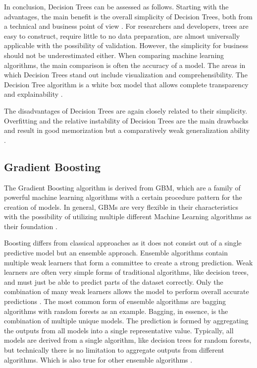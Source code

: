 In conclusion, Decision Trees can be assessed as follows. Starting with the advantages,
the main benefit is the overall simplicity of Decision Trees, both from a technical and 
business point of view \cite[p. 339]{James2021}. For researchers and developers, trees are easy to construct, require little
to no data preparation, are almost universally applicable with the possibility of validation. 
However, the simplicity for business should not be underestimated either. When comparing machine
learning algorithms, the main comparison is often the accuracy of a model. The areas in which 
Decision Trees stand out include visualization and comprehensibility. The Decision Tree algorithm 
is a white box model that allows complete transparency and explainability \cite{scikit-decision_tree}. 

The disadvantages of Decision Trees are again closely related to their simplicity. Overfitting and 
the relative instability of Decision Trees are the main drawbacks and result in good memorization 
but a comparatively weak generalization ability \cite[p. 340]{James2021} \cite{scikit-decision_tree}.

\subsection{Gradient Boosting}
\label{sec:Gradient Boosting}


The Gradient Boosting algorithm is derived from \ac{GBM}, which are a family of 
powerful machine learning algorithms with a certain procedure pattern for the creation of models. 
In general, \acp{GBM} are very flexible in their characteristics with the possibility of utilizing 
multiple different Machine Learning algorithms as their foundation \cite{Natekin2013}.

Boosting differs from classical approaches as it does not consist out of a single predictive 
model but an ensemble approach. Ensemble algorithms contain multiple weak learners that form a 
committee to create a strong prediction. Weak learners are often very simple forms of traditional 
algorithms, like decision trees, and must just be able to predict parts of the dataset correctly. 
Only the combination of many weak learners allows the model to perform overall accurate 
predictions \cite{parr2022gb_explained_dtt} \cite[p. 1f]{Buhlmann2004Bagging}. The most common form of ensemble algorithms are bagging algorithms with random 
forests as an example. Bagging, in essence, is the combination of multiple unique models. The 
prediction is formed by aggregating the outputs from all models into a single representative 
value. Typically, all models are derived from a single algorithm, like decision trees for random 
forests, but technically there is no limitation to aggregate outputs from different algorithms. 
Which is also true for other ensemble algorithms \cite[p. 2]{Buhlmann2004Bagging}. 


